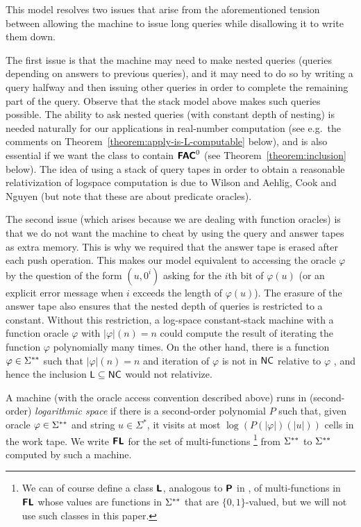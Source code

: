 \documentclass[a4paper,UKenglish]{lipics}
\begin{document}
This model resolves two issues that arise 
from the aforementioned tension between 
allowing the machine to issue long queries
while disallowing it to write them down. 

The first issue is that 
the machine may need to make nested queries 
(queries depending on answers to previous queries), and 
it may need to do so by writing a query halfway 
and then issuing other queries in order to complete the remaining part of the query.  
Observe that the stack model above makes such queries possible. 
The ability to ask nested queries (with constant depth of nesting) is needed naturally 
for our applications in real-number computation
(see e.g.\ the comments on Theorem~\ref{theorem:apply-is-L-computable} below), 
and is also essential if we want the class to contain
$\text{\bfseries \sffamily \upshape FAC} ^0$ 
(see Theorem~\ref{theorem:inclusion} below). 
The idea of using a stack of query tapes 
in order to obtain a reasonable relativization of logspace computation
is due to Wilson \cite{wilson1988measure} and 
Aehlig, Cook and Nguyen \cite{aehlig2007relativizing}
(but note that these are about predicate oracles). 

The second issue (which arises because we are dealing with function oracles) is that 
we do not want the machine to cheat by 
using the query and answer tapes as extra memory. 
This is why we required that 
the answer tape is erased after each push operation. 
This makes our model equivalent to 
accessing the oracle $\varphi$ by the question of the form $(u, 0 ^i)$ 
asking for the $i$th bit of $\varphi (u)$ (or an explicit error message 
when $i$ exceeds the length of $\varphi (u)$).
The erasure of the answer tape also
ensures that the nested depth of queries is restricted to a constant.
Without this restriction, a log-space constant-stack machine with 
a function oracle $\varphi$ with $|\varphi|(n) = n$ 
could compute the result of iterating the function $\varphi$ polynomially many times.
On the other hand, there is a function $\varphi \in \Sigma ^{**}$ such that $|\varphi|(n) = n$
and iteration of $\varphi$ is not in $\mathsf{NC}$ relative to $\varphi$ \cite{aehlig2007relativizing}, 
and hence the inclusion $\mathsf{L} \subseteq \mathsf{NC}$ would not relativize.

\begin{definition}
 A machine (with the oracle access convention described above) 
 runs in (second-order) \emph{logarithmic space}
 if there is a second-order polynomial $P$ such that, 
 given oracle $\varphi \in \Sigma ^{**}$ and string $u \in \Sigma^*$, 
 it visits at most $\log(P(|\varphi|)(|u|))$ cells
 in the work tape.
 We write $\text{\bfseries \sffamily \upshape FL}$ for the set of multi-functions%
\footnote{%
We can of course define a class $\text{\bfseries \sffamily \upshape L}$, 
analogous to $\text{\bfseries \sffamily \upshape P}$ in \cite{kawamura2012complexity}, 
of multi-functions in $\text{\bfseries \sffamily \upshape FL}$ whose values are functions in $\Sigma ^{**}$ 
that are $\{0, 1\}$-valued, 
but we will not use such classes in this paper. 
}
 from $\Sigma ^{**}$ to $\Sigma ^{**}$ 
 computed by such a machine.
\end{definition}
\end{document}
